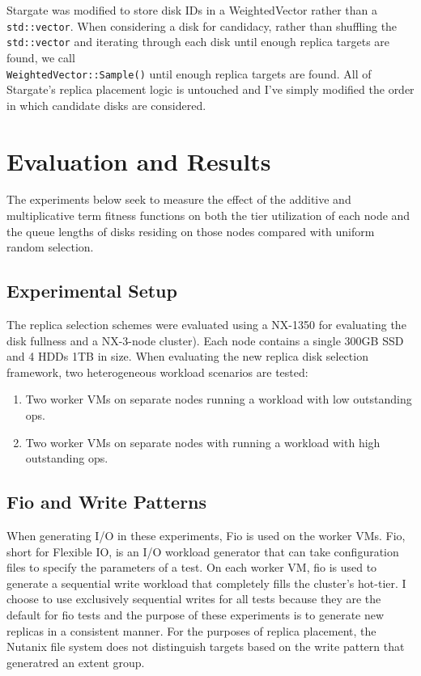 \documentclass[12pt]{article}
\begin{document}
  Stargate was modified to store disk IDs in a WeightedVector rather than a
  \texttt{std::vector}. When considering a disk for candidacy, rather than
  shuffling the \texttt{std::vector} and iterating through each disk until
  enough replica targets are found, we call \\
  \texttt{WeightedVector::Sample()} until enough replica targets are
  found. All of Stargate's replica placement logic is untouched and I've simply
  modified the order in which candidate disks are considered.
      

\newpage
\FloatBarrier
\section{Evaluation and Results}

The experiments below seek to measure the effect of the additive and
multiplicative term fitness functions on both the tier utilization of each node
and the queue lengths of disks residing on those nodes compared with uniform
random selection.

  \subsection{Experimental Setup}

  The replica selection schemes were evaluated using a NX-1350 for evaluating
  the disk fullness and a NX-3-node cluster). Each node contains a single 300GB
  SSD and 4 HDDs 1TB in size. When evaluating the new replica disk selection
  framework, two heterogeneous workload scenarios are tested:
 
  \begin{enumerate}
    \item Two worker VMs on separate nodes running a workload with low
          outstanding ops.
    \item Two worker VMs on separate nodes with running a
          workload with high outstanding ops.
  \end{enumerate}
 
  \subsection{Fio and Write Patterns}

  When generating I/O in these experiments, Fio is used on the worker VMs. Fio,
  short for Flexible IO, is an I/O workload generator that can take
  configuration files to specify the parameters of a test. On each worker VM,
  fio is used to generate a sequential write workload that completely fills the
  cluster's hot-tier. I choose to use exclusively sequential writes for all
  tests because they are the default for fio tests and the purpose of these
  experiments is to generate new replicas in a consistent manner. For the
  purposes of replica placement, the Nutanix file system does not distinguish
  targets based on the write pattern that generatred an extent group.
\end{document}
